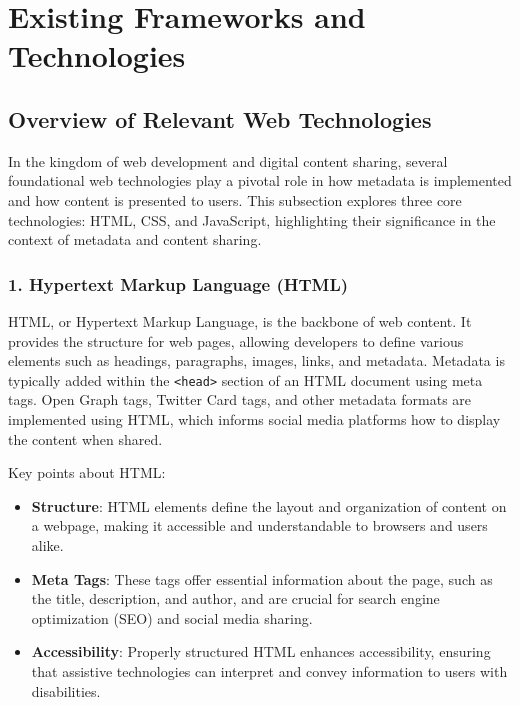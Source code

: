 \section{Existing Frameworks and Technologies}
\label{sec:frameworks_technologies}

\subsection{Overview of Relevant Web Technologies}
\label{subsec:overview_of_relevant_web_technologies}

In the kingdom of web development and digital content sharing, several foundational web technologies play a pivotal role in how metadata is implemented and how content is presented to users. This subsection explores three core technologies: HTML, CSS, and JavaScript, highlighting their significance in the context of metadata and content sharing.

\subsubsection{1. Hypertext Markup Language (HTML)}

HTML, or Hypertext Markup Language, is the backbone of web content. It provides the structure for web pages, allowing developers to define various elements such as headings, paragraphs, images, links, and metadata. Metadata is typically added within the \texttt{<head>} section of an HTML document using meta tags. Open Graph tags, Twitter Card tags, and other metadata formats are implemented using HTML, which informs social media platforms how to display the content when shared.

Key points about HTML:
\begin{itemize}
    \item \textbf{Structure}: HTML elements define the layout and organization of content on a webpage, making it accessible and understandable to browsers and users alike.
    \item \textbf{Meta Tags}: These tags offer essential information about the page, such as the title, description, and author, and are crucial for search engine optimization (SEO) and social media sharing.
    \item \textbf{Accessibility}: Properly structured HTML enhances accessibility, ensuring that assistive technologies can interpret and convey information to users with disabilities.
\end{itemize}

